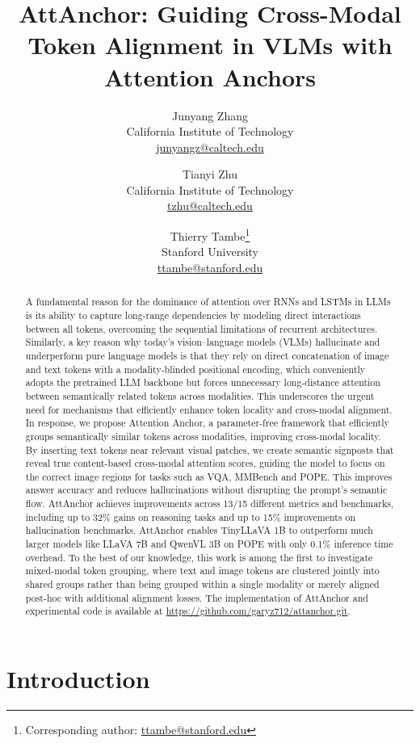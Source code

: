 \documentclass[11pt]{article}
\title{AttAnchor: Guiding Cross-Modal Token Alignment in VLMs with Attention Anchors}
\author{Junyang Zhang\\
California Institute of Technology\\
\href{mailto:junyangz@caltech.edu}{junyangz@caltech.edu}
\and
Tianyi Zhu\\
California Institute of Technology\\
\href{mailto:tzhu@caltech.edu}{tzhu@caltech.edu}
\and
Thierry Tambe\footnote{Corresponding author: \href{mailto:ttambe@stanford.edu}{ttambe@stanford.edu}}\\
Stanford University\\
\href{mailto:ttambe@stanford.edu}{ttambe@stanford.edu}
}
\begin{document}
\captionsetup{position=bottom}
\captionsetup[figure]{position=bottom}
\captionsetup[table]{position=bottom}

\maketitle

\begin{abstract}
A fundamental reason for the dominance of attention over RNNs and LSTMs in LLMs is its ability to capture long-range dependencies by modeling direct interactions between all tokens, overcoming the sequential limitations of recurrent architectures. Similarly, a key reason why today's vision–language models (VLMs) hallucinate and underperform pure language models is that they rely on direct concatenation of image and text tokens with a modality-blinded positional encoding, which conveniently adopts the pretrained LLM backbone but forces unnecessary long-distance attention between semantically related tokens across modalities. This underscores the urgent need for mechanisms that efficiently enhance token locality and cross-modal alignment. In response, we propose Attention Anchor, a parameter-free framework that efficiently groups semantically similar tokens across modalities, improving cross-modal locality. By inserting text tokens near relevant visual patches, we create semantic signposts that reveal true content-based cross-modal attention scores, guiding the model to focus on the correct image regions for tasks such as VQA, MMBench and POPE. This improves answer accuracy and reduces hallucinations without disrupting the prompt's semantic flow. AttAnchor achieves improvements across 13/15 different metrics and benchmarks, including up to 32\% gains on reasoning tasks and up to 15\% improvements on hallucination benchmarks. AttAnchor enables TinyLLaVA 1B to outperform much larger models like LLaVA 7B and QwenVL 3B on POPE with only 0.1\% inference time overhead. To the best of our knowledge, this work is among the first to investigate mixed-modal token grouping, where text and image tokens are clustered jointly into shared groups rather than being grouped within a single modality or merely aligned post-hoc with additional alignment losses. The implementation of AttAnchor and experimental code is available at \url{https://github.com/garyz712/attanchor.git}. 
\end{abstract}

\section{Introduction}
\end{document}
